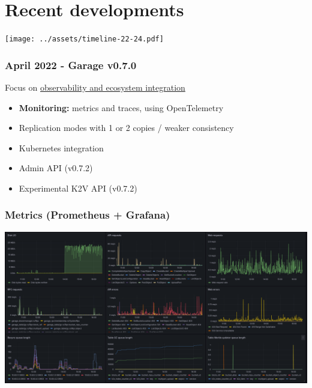\documentclass[aspectratio=169]{beamer}
\begin{document}

\section{Recent developments}


\begin{frame}
	\begin{center}
		\texttt{[image: ../assets/timeline-22-24.pdf]}
	\end{center}
\end{frame}

\begin{frame}
	\frametitle{April 2022 - Garage v0.7.0}
	Focus on \underline{observability and ecosystem integration}
	\vspace{2em}
	\begin{itemize}
		\item \textbf{Monitoring:} metrics and traces, using OpenTelemetry
			\vspace{1em}
		\item Replication modes with 1 or 2 copies / weaker consistency
			\vspace{1em}
		\item Kubernetes integration
			\vspace{1em}
		\item Admin API (v0.7.2)
			\vspace{1em}
		\item Experimental K2V API (v0.7.2)
	\end{itemize}
\end{frame}

\begin{frame}
	\frametitle{Metrics (Prometheus + Grafana)}
	\begin{center}
		\includegraphics[width=.9\linewidth]{../assets/screenshots/grafana_dashboard.png}
	\end{center}
\end{frame}
\end{document}
